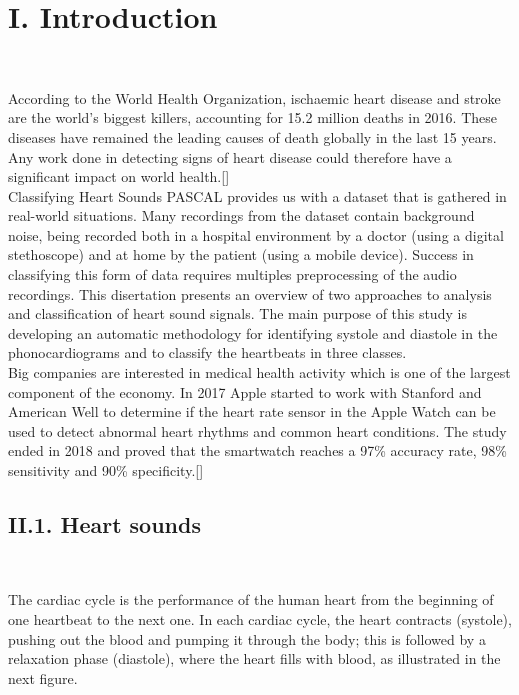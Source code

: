 \documentclass[11pt, a4papper]{report}
\theoremstyle{plain}
\theoremstyle{definition}
\theoremstyle{definition}
\theoremstyle{proposition}
\begin{document}
\tableofcontents

\newpage

\chapter*{I. Introduction}

\

According to the World Health Organization, ischaemic heart disease and stroke are the world’s biggest killers, accounting for 15.2 million deaths in 2016. These diseases have remained the leading causes of death globally in the last 15 years. Any work done in detecting signs of heart disease could therefore have a significant impact on world health.[]
\\

Classifying Heart Sounds PASCAL provides us with a dataset that is gathered in real-world situations. Many recordings from the dataset contain background noise, being recorded both in a hospital environment by a doctor (using a digital stethoscope) and at home by the patient (using a mobile device). Success in classifying this form of data requires multiples preprocessing of the audio recordings. This disertation presents an overview of two approaches to analysis and classification of heart sound signals. The main purpose of this study is developing an automatic methodology for identifying systole and diastole in the phonocardiograms and to classify the heartbeats in three classes.
\\

Big companies are interested in medical health activity which is one of the largest component of the economy. In 2017 Apple started to work with Stanford and American Well to determine if the heart rate sensor in the Apple Watch can be used to detect abnormal heart rhythms and common heart conditions. The study ended in 2018 and proved that the smartwatch reaches a 97\% accuracy rate, 98\% sensitivity and 90\% specificity.[]


\section*{II.1. Heart sounds}

\

The cardiac cycle is the performance of the human heart from the beginning of one heartbeat to the next one. In each cardiac cycle, the heart contracts (systole), pushing out the blood and pumping it through the body; this is followed by a relaxation phase (diastole), where the heart fills with blood, as illustrated in the next figure. 
\\
\end{document}
